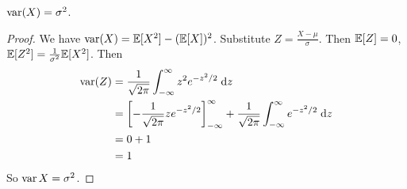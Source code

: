 %
\begin{note}
  \begin{field}
    \begin{prop}
      $\operatorname{var}(X) = \sigma^2$.
    \end{prop}
  \end{field}
  \begin{field}
    \begin{proof}
      We have $\operatorname{var} (X) = \mathbb{E}[X^2] - (\mathbb{E}[X])^2$. Substitute $Z = \frac{X - \mu}{\sigma}$. Then $\mathbb{E}[Z] = 0$, $\mathbb{E}[Z^2] = \frac{1}{\sigma^2}\mathbb{E}[X^2]$.
      Then
      \begin{align*}
        \operatorname{var}(Z) &= \frac{1}{\sqrt{2\pi}} \int_{-\infty}^\infty z^2 e^{-z^2/2}\;\mathrm{d} z\\
        &= \left[-\frac{1}{\sqrt{2\pi}}ze^{-z^2/2}\right]_{-\infty}^\infty + \frac{1}{\sqrt{2\pi}}\int_{-\infty}^\infty e^{-z^2/2}\;\mathrm{d} z\\
        &= 0 + 1\\
        &= 1
      \end{align*}
      So $\operatorname{var} X = \sigma^2$.
    \end{proof}
  \end{field}
  \xplain{}%
\end{note}

